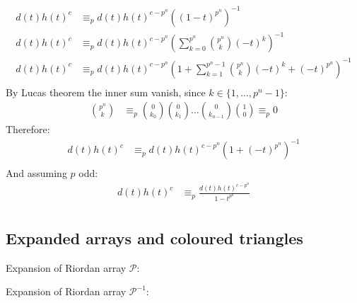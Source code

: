 \documentclass[11pt,a4paper]{article} %
\begin{document}
      \begin{displaymath}
          \begin{split}
                d(t)h(t)^{c} &\equiv_p d(t)h(t)^{c-p^n}\left( (1-t)^{p^n}\right)^{-1} \\
                d(t)h(t)^{c} &\equiv_p d(t)h(t)^{c-p^n}\left(\sum_{k=0}^{p^n}{{{p^n} \choose {k}}(-t)^k } \right)^{-1}\\
                d(t)h(t)^{c} &\equiv_p d(t)h(t)^{c-p^n}\left(
                    1 + \sum_{k=1}^{p^n -1}{{{p^n} \choose {k}}(-t)^k +(-t)^{p^n} }\right)^{-1} \\
          \end{split}
      \end{displaymath}
    By Lucas theorem the inner sum vanish, since $k\in\lbrace 1, \ldots, p^n -1 \rbrace$:
      \begin{displaymath}
        \begin{split}
          {{p^n} \choose {k}} &\equiv_{p} {{0} \choose {k_0}} {{0} \choose {k_1}} \ldots 
          {{0} \choose {k_{n-1}}}{{1} \choose {0}}\equiv_{p} 0 
        \end{split}
      \end{displaymath}
    Therefore:
      \begin{displaymath}
          \begin{split}
                d(t)h(t)^{c} &\equiv_p d(t)h(t)^{c-p^n}\left(1 + (-t)^{p^n}\right)^{-1} \\
          \end{split}
      \end{displaymath}
    And assuming $p$ odd:
      \begin{displaymath}
          \begin{split}
                d(t)h(t)^{c} &\equiv_p \frac{d(t)h(t)^{c-p^n}}{1 - t^{p^n}} \\
          \end{split}
      \end{displaymath}



    \subsection{Expanded arrays and coloured triangles}

    Expansion of Riordan array $\mathcal{P}$:
    
    Expansion of Riordan array $\mathcal{P}^{-1}$:
    
\end{document}
